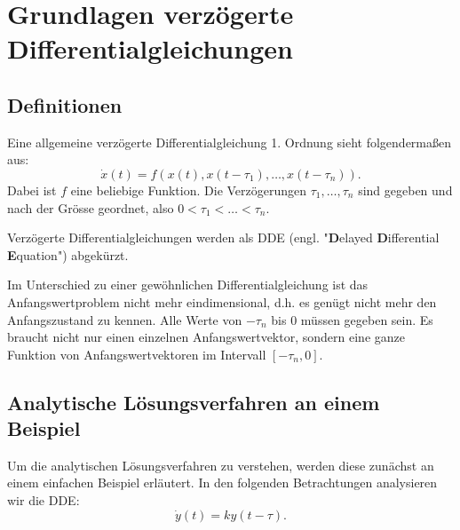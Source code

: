 %
%
%
\section{Grundlagen verzögerte Differentialgleichungen}
\subsection{Definitionen}


\begin{definition}
	Eine allgemeine verzögerte Differentialgleichung 1. Ordnung sieht folgendermaßen aus:
	\begin{equation}
		\dot{x}(t) = f(x(t),x(t-\tau_1),\dots,x(t-\tau_n)).
	\end{equation}
	Dabei ist $f$ eine beliebige Funktion. Die Verzögerungen $\tau_1,\dots,\tau_n$ sind gegeben und nach der Grösse geordnet, also $0<\tau_1<\dots<\tau_n$.
\end{definition}
Verzögerte Differentialgleichungen werden als DDE (engl. "\textbf{D}elayed \textbf{D}ifferential \textbf{E}quation") abgekürzt.

Im Unterschied zu einer gewöhnlichen Differentialgleichung ist das Anfangswertproblem nicht mehr eindimensional, d.h. es genügt nicht mehr den Anfangszustand zu kennen.
Alle Werte von $-\tau_n$ bis $0$ müssen gegeben sein. 
Es braucht nicht nur einen einzelnen Anfangswertvektor, sondern eine ganze Funktion von Anfangswertvektoren im Intervall $[-\tau_n, 0]$.

\subsection{Analytische Lösungsverfahren an einem Beispiel}
Um die analytischen Lösungsverfahren zu verstehen, werden diese zunächst an einem einfachen Beispiel erläutert.
In den folgenden Betrachtungen analysieren wir die DDE:
\begin{equation}\label{bsp}
\dot{y}(t)=ky(t-\tau).
\end{equation}


